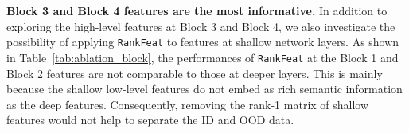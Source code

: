 \begin{table}[htbp]
    \caption{The ablation study on applying \texttt{RankFeat} to features at different network depths.} \centering
    \label{tab:ablation_block}
\end{table}

\noindent \textbf{Block 3 and Block 4 features are the most informative.} In addition to exploring the high-level features at Block 3 and Block 4, we also investigate the possibility of applying \texttt{RankFeat} to features at shallow network layers. As shown in Table~\ref{tab:ablation_block}, the performances of \texttt{RankFeat} at the Block 1 and Block 2 features are not comparable to those at deeper layers. This is mainly because the shallow low-level features do not embed as rich semantic information as the deep features. Consequently, removing the rank-1 matrix of shallow features would not help to separate the ID and OOD data. 







